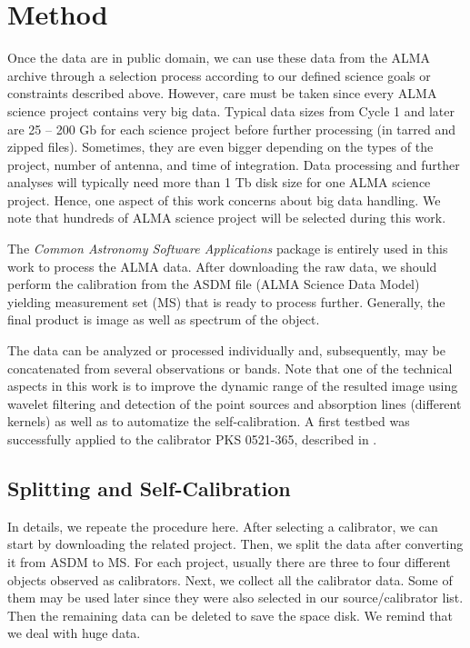 
\section{Method}

Once the data are in public domain,  we can use these data from the ALMA archive through a selection process according to our defined science goals or constraints described above. However, care must be taken since every ALMA science project contains very big data. Typical data sizes from Cycle 1 and later are 25 -- 200 Gb for each science project before further processing (in tarred and zipped files). Sometimes, they are even bigger depending on the types of  the project, number of antenna, and time of integration. Data processing and further analyses will typically need more than 1 Tb disk size for one ALMA science project. Hence, one aspect of this work concerns about big data handling. We note that hundreds of ALMA science project will be selected during this work.

The {\it Common Astronomy Software Applications} package \citep[CASA, ][]{casa} is entirely used in this work to process the ALMA data. After downloading the raw data, we should perform the calibration from the ASDM file (ALMA Science Data Model) yielding
measurement set (MS) that is ready to process further. Generally, the final product is image as well as spectrum of the object. 

The data can be analyzed or processed individually and, subsequently, may be concatenated from several observations or bands. 
Note that one of the technical 
aspects in this work is to improve the dynamic range of the resulted image using wavelet filtering and detection of the 
point sources and absorption lines (different kernels) as well as to automatize the self-calibration. A first testbed was 
successfully applied to the calibrator PKS 0521-365, described in \cite{leon2016}.

\subsection{Splitting and Self-Calibration}

In details, we repeate the procedure here.
After selecting a calibrator, we can start by downloading the related project. Then, we split the data after converting it 
from ASDM to MS. For each project, usually there are three to four different objects observed as calibrators. Next, we collect 
all the calibrator data. Some of them 
may be used later since they were also selected in our source/calibrator list. Then the remaining data can be deleted to save the 
space disk. We remind that we deal with huge data.  

